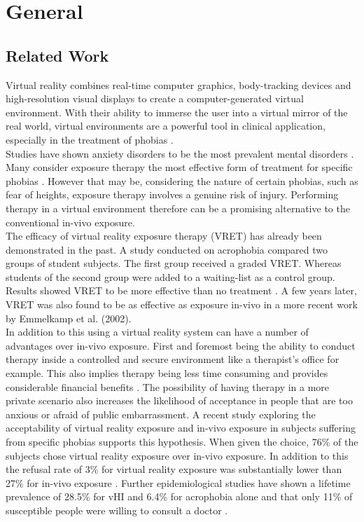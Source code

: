 \section{General}
\subsection{Related Work}
Virtual reality combines real-time computer graphics, body-tracking devices and high-resolution visual displays to create a computer-generated virtual environment. With their ability to immerse the user into a virtual mirror of the real world, virtual environments are a powerful tool in clinical application, especially in the treatment of phobias \cite{RIVA2003}. \\
Studies have shown anxiety disorders to be the most prevalent mental disorders \cite{KESSLER2005}. Many consider exposure therapy the most effective form of treatment for specific phobias \cite{DERUBEIS1998}. However that may be, considering the nature of certain phobias, such as fear of heights, exposure therapy involves a genuine risk of injury. Performing therapy in a virtual environment therefore can be a promising alternative to the conventional in-vivo exposure.\\ 
The efficacy of virtual reality exposure therapy (VRET) has already been demonstrated in the past. A study conducted on acrophobia compared two groups of student subjects. The first group received a graded VRET. Whereas students of the second group were added to a waiting-list as a control group. Results showed VRET to be more effective than no treatment \cite{ROTHBAUM1995}. A few years later, VRET was also found to be as effective as exposure in-vivo in a more recent work by Emmelkamp et al. (2002).\\
In addition to this using a virtual reality system can have a number of advantages over in-vivo exposure. First and foremost being the ability to conduct therapy inside a controlled and secure environment like a therapist's office for example. This also implies therapy being less time consuming and provides considerable financial benefits \cite{CAVANAGH2004}. The possibility of having therapy in a more private scenario also increases the likelihood of acceptance in people that are too anxious or afraid of public embarrassment. 
A recent study exploring the acceptability of virtual reality exposure and in-vivo exposure in subjects suffering from specific phobias supports this hypothesis. When given the choice, 76\% of the subjects chose virtual reality exposure over in-vivo exposure. In addition to this the refusal rate of 3\% for virtual reality exposure was substantially lower than 27\% for in-vivo exposure \cite{GARCIA2007}. Further epidemiological studies have shown a lifetime prevalence of 28.5\% for vHI and 6.4\% for acrophobia alone and that only 11\% of susceptible people were willing to consult a doctor \cite{HUPPERT2013} \cite{Kapfhammer2015}.\\
